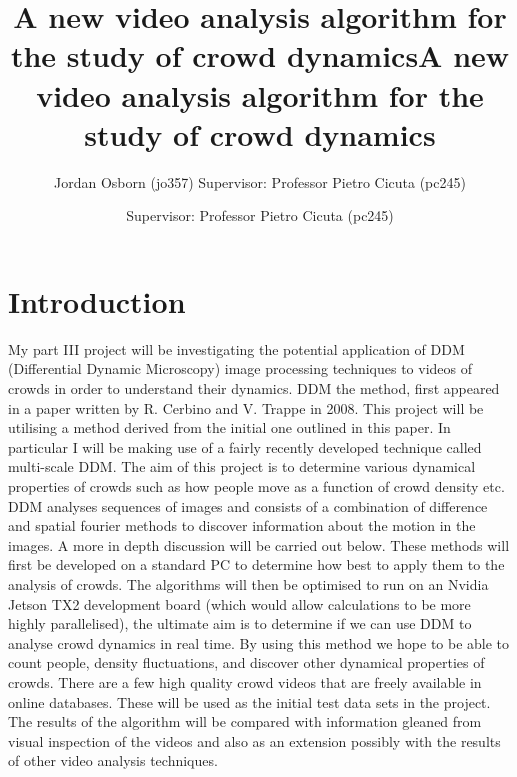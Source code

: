\documentclass[11pt]{article}
\title{A new video analysis algorithm for the study of crowd dynamics}
\author{Jordan Osborn (jo357) Supervisor: Professor Pietro Cicuta (pc245)}
\begin{document}
\begin{titlingpage}
    \maketitle
\end{titlingpage}
\clearpage

\title{A new video analysis algorithm for the study of crowd dynamics}
\author{Supervisor: Professor Pietro Cicuta (pc245)}
\maketitle

\section{Introduction}
My part III project will be investigating the potential application of DDM (Differential Dynamic Microscopy) image processing techniques to videos of crowds in order to understand their dynamics.
DDM the method, first appeared in a paper written by R. Cerbino and V. Trappe in 2008.\cite{ddm0}
This project will be utilising a method derived from the initial one outlined in this paper.
In particular I will be making use of a fairly recently developed technique called multi-scale DDM.\cite{ddm1}
The aim of this project is to determine various dynamical properties of crowds such as how people move as a function of crowd density etc.
DDM analyses sequences of images and consists of a combination of difference and spatial fourier methods to discover information about the motion in the images.
A more in depth discussion will be carried out below.
These methods will first be developed on a standard PC to determine how best to apply them to the analysis of crowds.
The algorithms will then be optimised to run on an Nvidia Jetson TX2 development board (which would allow calculations to be more highly parallelised), the ultimate aim is to determine if we can use DDM to analyse crowd dynamics in real time.
By using this method we hope to be able to count people, density fluctuations, and discover other dynamical properties of crowds.
There are a few high quality crowd videos that are freely available in online databases.\cite{crowdMotionDB}
These will be used as the initial test data sets in the project.
The results of the algorithm will be compared with information gleaned from visual inspection of the videos and also as an extension possibly with the results of other video analysis techniques.
\\\\
\end{document}
